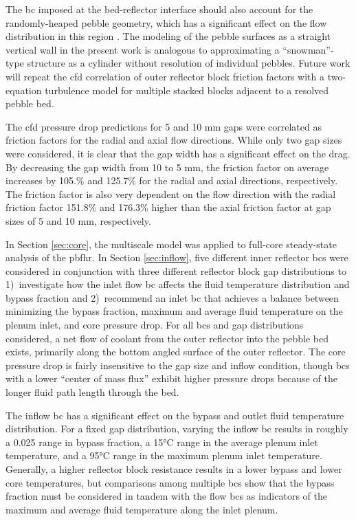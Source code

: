 The \gls{bc} imposed at the bed-reflector interface should also account for the randomly-heaped pebble geometry, which has a significant effect on the flow distribution in this region \cite{amini}. The modeling of the pebble surfaces as a straight vertical wall in the present work is analogous to approximating a ``snowman''-type structure as a cylinder without resolution of individual pebbles. Future work will repeat the \gls{cfd} correlation of outer reflector block friction factors with a two-equation turbulence model for multiple stacked blocks adjacent to a resolved pebble bed.

The \gls{cfd} pressure drop predictions for 5 and 10 \si{\milli\meter} gaps were correlated as friction factors for the radial and axial flow directions. While only two gap sizes were considered, it is clear that the gap width has a significant effect on the drag. By decreasing the gap width from 10 to 5 \si{\milli\meter}, the friction factor on average increases by 105.\% and 125.7\% for the radial and axial directions, respectively. The friction factor is also very dependent on the flow direction with the radial friction factor 151.8\% and 176.3\% higher than the axial friction factor at gap sizes of 5 and 10 \si{\milli\meter}, respectively. 

In Section \ref{sec:core}, the multiscale model was applied to full-core steady-state analysis of the \gls{pbfhr}. In Section \ref{sec:inflow}, five different inner reflector \glspl{bc} were considered in conjunction with three different reflector block gap distributions to 1)~investigate how the inlet flow \gls{bc} affects the fluid temperature distribution and bypass fraction and 2)~recommend an inlet \gls{bc} that achieves a balance between minimizing the bypass fraction, maximum and average fluid temperature on the plenum inlet, and core pressure drop. For all \glspl{bc} and gap distributions considered, a net flow of coolant from the outer reflector into the pebble bed exists, primarily along the bottom angled surface of the outer reflector. The core pressure drop is fairly insensitive to the gap size and inflow condition, though \glspl{bc} with a lower ``center of mass flux'' exhibit higher pressure drops because of the longer fluid path length through the bed.

The inflow \gls{bc} has a significant effect on the bypass and outlet fluid temperature distribution. For a fixed gap distribution, varying the inflow \gls{bc} results in roughly a 0.025 range in bypass fraction, a 15\si{\celsius} range in the average plenum inlet temperature, and a 95\si{\celsius} range in the maximum plenum inlet temperature. Generally, a higher reflector block resistance results in a lower bypass and lower core temperatures, but comparisons among multiple \glspl{bc} show that the bypass fraction must be considered in tandem with the flow \glspl{bc} as indicators of the maximum and average fluid temperature along the inlet plenum. 

